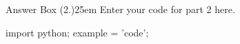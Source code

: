 \documentclass[12pt]{article}
\begin{document}


\begin{code}{Answer Box (2.)}{25em}
    Enter your code for part 2 here.

    import python;
    example = 'code';
\end{code}




\end{document}
